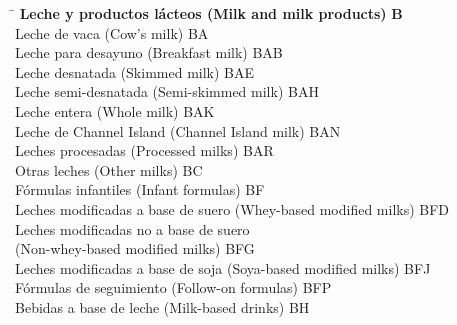 \begin{small}
    \vspace{-1.25cm}

    \begin{tabbing}
    \hspace{15cm} \= \hspace{0cm} \kill
        \textbf{Leche y productos lácteos (Milk and milk products)} \> \textbf{B} \\
            \hspace{0.5cm}Leche de vaca (Cow's milk) \> BA \\
                \hspace{1cm}Leche para desayuno (Breakfast milk) \> BAB \\
                \hspace{1cm}Leche desnatada (Skimmed milk) \> BAE \\
                \hspace{1cm}Leche semi-desnatada (Semi-skimmed milk) \> BAH \\
                \hspace{1cm}Leche entera (Whole milk) \> BAK \\
                \hspace{1cm}Leche de Channel Island (Channel Island milk) \> BAN \\
                \hspace{1cm}Leches procesadas (Processed milks) \> BAR \\
            \hspace{0.5cm}Otras leches (Other milks) \> BC \\
            \hspace{0.5cm}Fórmulas infantiles (Infant formulas) \> BF \\
                \hspace{1cm}Leches modificadas a base de suero (Whey-based modified milks) \> BFD \\
                \hspace{1cm}Leches modificadas no a base de suero \\
                \hspace{1cm}(Non-whey-based modified milks) \> BFG \\
                \hspace{1cm}Leches modificadas a base de soja (Soya-based modified milks) \> BFJ \\
                \hspace{1cm}Fórmulas de seguimiento (Follow-on formulas) \> BFP \\
            \hspace{0.5cm}Bebidas a base de leche (Milk-based drinks) \> BH \\

\end{tabbing}
\end{small}
